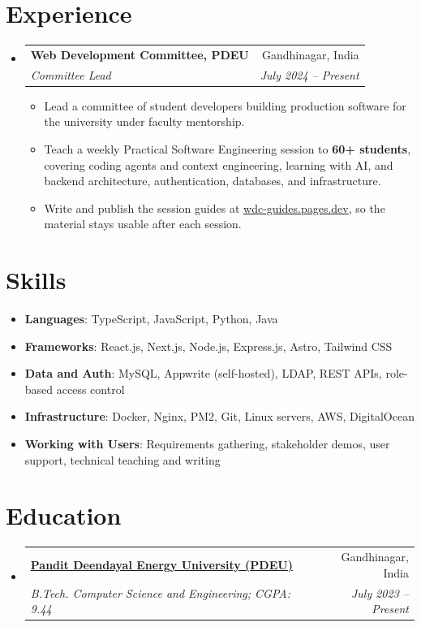 \documentclass[a4paper,11pt]{article}
\makeatletter
\newcommand{\resumeItem}[2]{
  \item\small{\textbf{#1}{: #2 \vspace{-2pt}}}
}
\newcommand{\resumeSubheadingFull}[4]{
  \vspace{-1pt}\item
    \begin{tabular*}{0.97\textwidth}{l@{\extracolsep{\fill}}r}
    \textbf{#1} & #2 \\
    \textit{#3} & \textit{#4} \\
    \end{tabular*}\vspace{-5pt}
}
\newcommand{\resumeSubItem}[2]{\resumeItem{#1}{#2}\vspace{-3pt}}
\newcommand{\resumeSubHeadingListStart}{\begin{itemize}[leftmargin=*]}
\newcommand{\resumeSubHeadingListEnd}{\end{itemize}}
\newcommand{\resumeItemListStart}{\begin{itemize}[itemsep=1pt,topsep=3pt]\small}
\newcommand{\resumeItemListEnd}{\end{itemize}\vspace{-3pt}}
\makeatother
\begin{document}
\section{Experience}
  \resumeSubHeadingListStart
    \resumeSubheadingFull{Web Development Committee, PDEU}{Gandhinagar, India}
      {Committee Lead}{July 2024 -- Present}
      \resumeItemListStart
        \item Lead a committee of student developers building production software for the university under faculty mentorship.
        \item Teach a weekly Practical Software Engineering session to \textbf{60+ students}, covering coding agents and context engineering, learning with AI, and backend architecture, authentication, databases, and infrastructure.
        \item Write and publish the session guides at \href{https://wdc-guides.pages.dev/guides/}{wdc-guides.pages.dev}, so the material stays usable after each session.
      \resumeItemListEnd
  \resumeSubHeadingListEnd

\section{Skills}
  \resumeSubHeadingListStart
    \resumeSubItem{Languages}{TypeScript, JavaScript, Python, Java}
    \resumeSubItem{Frameworks}{React.js, Next.js, Node.js, Express.js, Astro, Tailwind CSS}
    \resumeSubItem{Data and Auth}{MySQL, Appwrite (self-hosted), LDAP, REST APIs, role-based access control}
    \resumeSubItem{Infrastructure}{Docker, Nginx, PM2, Git, Linux servers, AWS, DigitalOcean}
    \resumeSubItem{Working with Users}{Requirements gathering, stakeholder demos, user support, technical teaching and writing}
  \resumeSubHeadingListEnd

\section{Education}
  \resumeSubHeadingListStart
    \resumeSubheadingFull
      {\href{https://pdeu.ac.in/}{Pandit Deendayal Energy University (PDEU)}}{Gandhinagar, India}
      {B.Tech. Computer Science and Engineering; CGPA: 9.44}{July 2023 -- Present}
  \resumeSubHeadingListEnd
\end{document}
